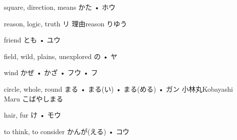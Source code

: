 



\setcounter{cardnum}{145}

		{square, direction, means}
		{かた • ホウ}
		{}{}
		{}{}
		{}{}
		{}{}
		{}{}

		{reason, logic, truth}
		{リ}
		{理由}{reason りゆう}
		{}{}
		{}{}
		{}{}
		{}{}

		{friend}
		{とも • ユウ}
		{}{}
		{}{}
		{}{}
		{}{}
		{}{}

		{field, wild, plains, unexplored}
		{の • ヤ}
		{}{}
		{}{}
		{}{}
		{}{}
		{}{}

		{wind}
		{かぜ • かざ • フウ • フ}
		{}{}
		{}{}
		{}{}
		{}{}
		{}{}

		{circle, whole, round}
		{まる • まる(い) • まる(める) • ガン}
		{小林丸}{Kobayashi Maru こばやしまる}
		{}{}
		{}{}
		{}{}
		{}{}

		{hair, fur}
		{け • モウ}
		{}{}
		{}{}
		{}{}
		{}{}
		{}{}

		{to think, to consider}
		{かんが(える) • コウ}
		{}{}
		{}{}
		{}{}
		{}{}
		{}{}

